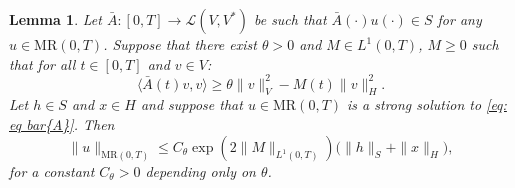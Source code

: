 \documentclass{amsart}
\renewcommand{\MR}{\mathrm{MR}}
\newcommand{\<}{\langle}
\newcommand{\?}{\rangle}
\theoremstyle{plain}
\theoremstyle{remark}
\theoremstyle{plain}
\newtheorem{lemma}[theorem]{Lemma}
\numberwithin{equation}{section}
\begin{document}
\begin{lemma}\label{lem: a priori}
Let $\bar{A}\colon [0,T]\to\mathcal{L}(V,V^*)$ be such that
$\bar{A}(\cdot)u(\cdot)\in S$ for any $u\in\MR(0,T)$.
Suppose that there exist $\theta>0$ and $M\in L^1(0,T)$, $M\geq 0$ such that for all $t\in[0,T]$ and $v\in V$:
\begin{equation}\label{eq: coercivity L_1}
\<\bar{A}(t)v,v\?\geq \theta \|v\|_V^2-M(t)\|v\|_H^2.
\end{equation}
Let $h\in S$ and $x\in H$ and suppose that $u\in \MR(0,T)$ is a strong solution to \eqref{eq: eq bar{A}}.
Then
\begin{equation}\label{eq: a priori}
\|u\|_{\MR(0,T)}\leq C_{\theta}\exp(2\|M\|_{L^1(0,T)})\big(\|h\|_S+\|x\|_H\big),
\end{equation}
for a constant $C_{\theta}>0$ depending only on $\theta$.
\end{lemma}
\end{document}
